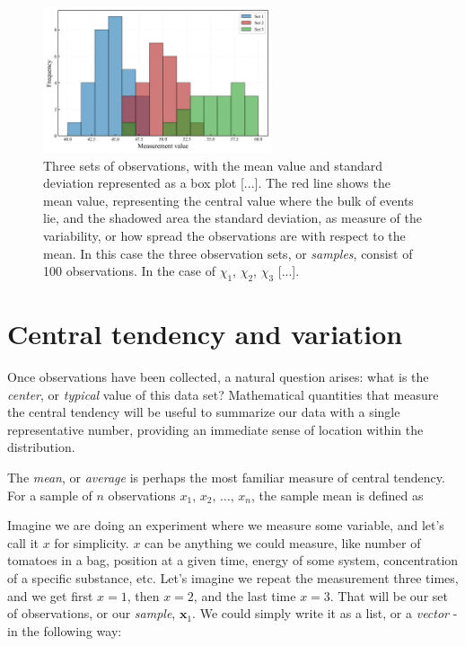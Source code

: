 \documentclass{book}
\begin{document}
\begin{figure}[ht]
    \centering
    \includegraphics[width=0.6\textwidth]{figures/chapter1/measurements_histogram.png}
    \caption{Three sets of observations, with the mean value and standard deviation represented as a box plot [...]. The red line shows the mean value, representing the central value where the bulk of events lie, and the shadowed area the standard deviation, as measure of the variability, or how spread the observations are with respect to the mean. In this case the three observation sets, or \textit{samples}, consist of 100 observations. In the case of $\chi_1$, $\chi_2$, $\chi_3$ [...].}
    \label{fig:histogram1}
\end{figure}

\section{Central tendency and variation}

Once observations have been collected, a natural question arises: what is the \textit{center}, or \textit{typical} value of this data set? Mathematical quantities that measure the central tendency will be useful to summarize our data with a single representative number, providing an immediate sense of location within the distribution.

The \textit{mean}, or \textit{average} is perhaps the most familiar measure of central tendency. For a sample of $n$ observations $x_1$, $x_2$, $\dots$, $x_n$, the sample mean is defined as

Imagine we are doing an experiment where we measure some variable, and let's call it $x$ for simplicity. $x$ can be anything we could measure, like number of tomatoes in a bag, position at a given time, energy of some system, concentration of a specific substance, etc. Let's imagine we repeat the measurement three times, and we get first $x = 1$, then $x = 2$, and the last time $x = 3$. That will be our set of observations, or our \textit{sample}, $\textbf{x}_{1}$. We could simply write it as a list, or a \textit{vector} - in the following way:
\end{document}
